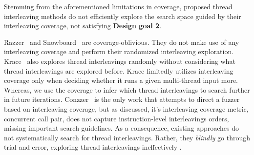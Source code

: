 







%
Stemming from the aforementioned limitations in coverage, proposed
thread interleaving methods do not efficiently explore the search
space guided by their interleaving coverage, not satisfying
\textbf{Design goal 2}.

Razzer~\cite{razzer} and Snowboard~\cite{snowboard} are coverage-oblivious.
They do not make use of any interleaving coverage 
and perform their randomized interleaving exploration.
%
Krace~\cite{krace} also explores thread interleavings randomly without
considering what thread interleavings are explored before.  Krace
limitedly utilizes interleaving coverage only when deciding whether it
runs a given multi-thread input more. Whereas, we use the coverage to
infer which thread interleavings to search further in future
iterations.
%
Conzzer~\cite{conzzer} is the only work that attempts to direct a
fuzzer based on interleaving coverage, but as discussed,  
it's interleaving coverage metric, concurrent call pair, does not capture instruction-level interleavings orders, missing important 
search guidelines.
%
As a consequence, existing approaches do not systematically search for
thread interleavings.  Rather, they \textit{blindly} go through
trial and error, exploring thread interleavings ineffectively .

